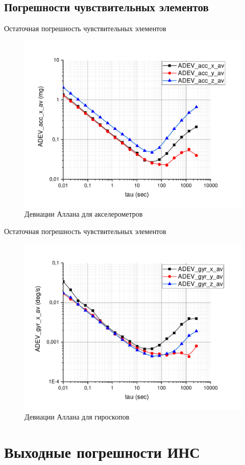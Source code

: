 \documentclass[aspectratio=43,display]{beamer}
\begin{document}
\subsection{Погрешности чувствительных элементов}
\begin{frame}{Остаточная погрешность чувствительных элементов}
\begin{figure}
\includegraphics[width=0.7\linewidth]{acc_av_adev.pdf}
\caption{\label{fig:mpr_1} Девиации Аллана для акселерометров}
\end{figure}	
\end{frame}


\begin{frame}{Остаточная погрешность чувствительных элементов}
\begin{figure}
\includegraphics[width=0.7\linewidth]{gyr_av_adev.pdf}
\caption{\label{fig:mpr_2} Девиации Аллана для гироскопов}
\end{figure}
\end{frame}


\section{Выходные погрешности ИНС}
\end{document}
